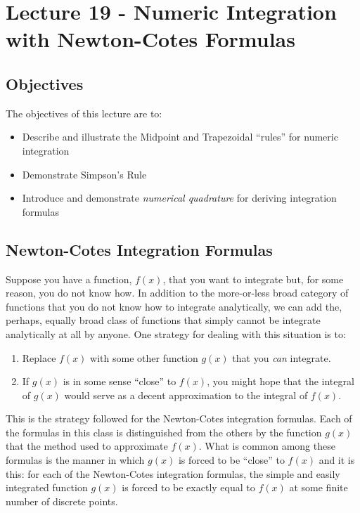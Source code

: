 \chapter{Lecture 19 - Numeric Integration with Newton-Cotes Formulas}
\label{ch:lec19n}
\section{Objectives}
The objectives of this lecture are to:
\begin{itemize}
\item Describe and illustrate the Midpoint and Trapezoidal ``rules'' for numeric integration
\item Demonstrate Simpson's Rule
\item Introduce and demonstrate \emph{numerical quadrature} for deriving integration formulas
\end{itemize}
\setcounter{lstannotation}{0}

\section{Newton-Cotes Integration Formulas}
Suppose you have a function, $f(x)$, that you want to integrate but, for some reason, you do not know how.  In addition to the more-or-less broad category of functions that you do not know how to integrate analytically, we can add the, perhaps, equally broad class of functions that simply cannot be integrate analytically at all by anyone.  One strategy for dealing with this situation is to:
\begin{enumerate}
\item Replace $f(x)$ with some other function $g(x)$ that you \emph{can} integrate.
\item If $g(x)$ is in some sense ``close'' to $f(x)$, you might hope that the integral of $g(x)$ would serve as a decent approximation to the integral of $f(x)$.
\end{enumerate}

This is the strategy followed for the Newton-Cotes integration formulas.  Each of the formulas in this class is distinguished from the others by the function $g(x)$ that the method used to approximate $f(x)$.  What is common among these formulas is the manner in which $g(x)$ is forced to be ``close'' to $f(x)$ and it is this: for each of the Newton-Cotes integration formulas, the simple and easily integrated function $g(x)$ is forced to be exactly equal to $f(x)$ at some finite number of discrete points.

